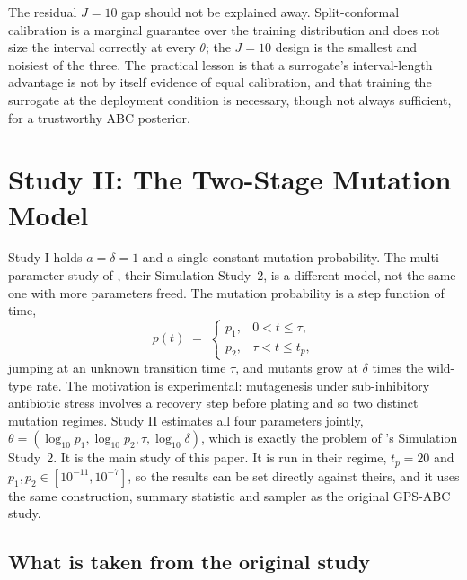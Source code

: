 \documentclass[sn-basic,iicol,pdflatex]{sn-jnl}
\begin{document}
The residual $J=10$ gap should not be explained away. Split-conformal calibration
is a marginal guarantee over the training distribution and does not size the
interval correctly at every $\theta$; the $J=10$ design is the smallest and
noisiest of the three. The practical lesson is that a surrogate's interval-length
advantage is not by itself evidence of equal calibration, and that training the
surrogate at the deployment condition is necessary, though not always
sufficient, for a trustworthy ABC posterior.

\section{Study II: The Two-Stage Mutation Model}
\label{sec:sim3D}


Study I holds $a=\delta=1$ and a single constant mutation probability. The
multi-parameter study of \citet{lu2023}, their Simulation Study~2, is a
different model, not the same one with more parameters freed. The mutation
probability is a step function of time,
\begin{equation}
p(t) \;=\;
\begin{cases}
p_1, & 0 < t \le \tau,\\[2pt]
p_2, & \tau < t \le t_p,
\end{cases}
\label{eq:twostage}
\end{equation}
jumping at an unknown transition time $\tau$, and mutants grow at $\delta$ times
the wild-type rate. The motivation is experimental: mutagenesis under
sub-inhibitory antibiotic stress involves a recovery step before plating and so
two distinct mutation regimes. Study II estimates all four parameters jointly,
$\theta=(\log_{10}p_1,\log_{10}p_2,\tau,\log_{10}\delta)$, which is exactly the
problem of \citeauthor{lu2023}'s Simulation Study~2. It is the main study of this
paper. It is run in their regime, $t_p=20$ and $p_1,p_2\in[10^{-11},10^{-7}]$, so
the results can be set directly against theirs, and it uses the same
construction, summary statistic and sampler as the original GPS-ABC study.

\subsection{What is taken from the original study}
\label{sec:groundtruth3D}
\end{document}

